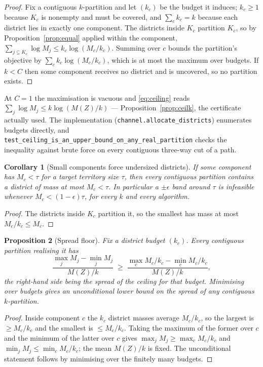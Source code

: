 \documentclass[11pt]{article}
\newtheorem{prop}{Proposition}
\newtheorem{cor}[prop]{Corollary}
\theoremstyle{definition}
\begin{document}
\begin{proof}
Fix a contiguous $k$-partition and let $(k_c)$ be the budget it induces; $k_c\ge1$ because
$K_c$ is nonempty and must be covered, and $\sum_c k_c=k$ because each district lies in
exactly one component. The districts inside $K_c$ partition $K_c$, so by
Proposition~\ref{prop:equal} applied within the component,
$\sum_{j\subseteq K_c}\log M_j\le k_c\log(M_c/k_c)$. Summing over $c$ bounds the
partition's objective by $\sum_c k_c\log(M_c/k_c)$, which is at most the maximum over
budgets. If $k<C$ then some component receives no district and is uncovered, so no
partition exists.
\end{proof}

At $C=1$ the maximisation is vacuous and \eqref{eq:ceiling} reads
$\sum_j\log M_j\le k\log(M(Z)/k)$ --- Proposition~\ref{prop:ceilk}, the certificate actually
used. The implementation (\texttt{channel.allocate\_districts}) enumerates budgets
directly, and
\texttt{test\_ceiling\_\allowbreak is\_an\_\allowbreak upper\_bound\_\allowbreak on\_any\_\allowbreak real\_partition}
checks the inequality against brute force on every contiguous three-way cut of a path.

\begin{cor}[Small components force undersized districts]\label{cor:small}
If some component has $M_c<\tau$ for a target territory size $\tau$, then every contiguous
partition contains a district of mass at most $M_c<\tau$. In particular a $\pm\epsilon$
band around $\tau$ is infeasible whenever $M_c<(1-\epsilon)\tau$, for every $k$ and every
algorithm.
\end{cor}

\begin{proof}
The districts inside $K_c$ partition it, so the smallest has mass at most $M_c/k_c\le M_c$.
\end{proof}

\begin{prop}[Spread floor]\label{prop:spread}
Fix a district budget $(k_c)$. Every contiguous partition realising it has
\[
\frac{\max_j M_j-\min_j M_j}{M(Z)/k}
\;\ge\;
\frac{\max_c M_c/k_c-\min_c M_c/k_c}{M(Z)/k},
\]
the right-hand side being the spread of the ceiling for that budget. Minimising over
budgets gives an unconditional lower bound on the spread of any contiguous $k$-partition.
\end{prop}

\begin{proof}
Inside component $c$ the $k_c$ district masses average $M_c/k_c$, so the largest is
$\ge M_c/k_c$ and the smallest is $\le M_c/k_c$. Taking the maximum of the former over $c$
and the minimum of the latter over $c$ gives $\max_j M_j\ge\max_c M_c/k_c$ and
$\min_j M_j\le\min_c M_c/k_c$; the mean $M(Z)/k$ is fixed. The unconditional statement
follows by minimising over the finitely many budgets.
\end{proof}
\end{document}
